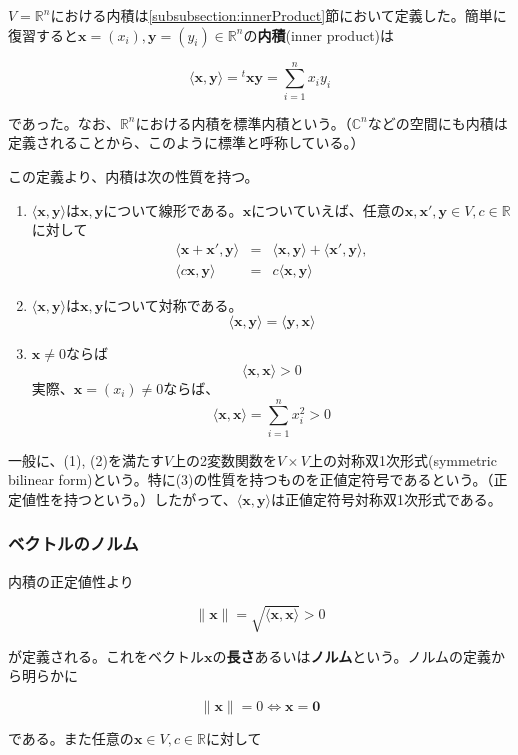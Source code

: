 \documentclass[dvipdfmx,autodetect-engine]{jsarticle}
\newcommand{\innerProduct}[2]{\langle \bm{#1}, \bm{#2} \rangle}
\newcommand{\transposeVec}[1]{{}^t\!{\bm{#1}}}
\newcommand{\vecSpace}[1]{\mathbb{R}^{#1}}
\begin{document}
$V = \vecSpace{n}$における内積は\ref{subsubsection:innerProduct}節において定義した。簡単に復習すると$\bm{x} = (x_i), \bm{y} = (y_i) \in \vecSpace{n}$の{\bf 内積}(inner product)は

$$
\innerProduct{x}{y} = \transposeVec{x}\bm{y} = \sum_{i = 1}^n x_iy_i
$$

であった。なお、$\vecSpace{n}$における内積を標準内積という。（$\mathbb{C}^n$などの空間にも内積は定義されることから、このように標準と呼称している。）

この定義より、内積は次の性質を持つ。

\begin{enumerate}
\renewcommand{\labelenumi}{(\arabic{enumi})}
\item $\innerProduct{x}{y}$は$\bm{x}, \bm{y}$について線形である。$\bm{x}$についていえば、任意の$\bm{x}, \bm{x}', \bm{y} \in V, c \in \mathbb{R}$に対して
\begin{eqnarray*}
\langle \bm{x} + \bm{x}', \bm{y} \rangle &= &\innerProduct{x}{y} + \innerProduct{x'}{y}, \\
\langle c\bm{x}, \bm{y} \rangle &= &c\innerProduct{x}{y}
\end{eqnarray*}
\item $\innerProduct{x}{y}$は$\bm{x}, \bm{y}$について対称である。
$$
\innerProduct{x}{y} = \innerProduct{y}{x}
$$
\item $\bm{x} \neq 0$ならば
$$
\innerProduct{x}{x} > 0
$$
実際、$\bm{x} = (x_i) \neq 0$ならば、
$$
\innerProduct{x}{x} = \sum_{i = 1}^n x_i^2 > 0
$$
\end{enumerate}

一般に、(1), (2)を満たす$V$上の2変数関数を$V \times V$上の対称双1次形式(symmetric bilinear form)という。特に(3)の性質を持つものを正値定符号であるという。（正定値性を持つという。）したがって、$\innerProduct{x}{y}$は正値定符号対称双1次形式である。

\subsubsection{ベクトルのノルム}

内積の正定値性より

$$
\|\bm{x}\| = \sqrt{\innerProduct{x}{x}} > 0
$$

が定義される。これをベクトル$\bm{x}$の{\bf 長さ}あるいは{\bf ノルム}という。ノルムの定義から明らかに

$$
\|\bm{x}\| = 0 \Longleftrightarrow \bm{x} = \bm{0}
$$

である。また任意の$\bm{x} \in V, c \in \mathbb{R}$に対して
\end{document}
